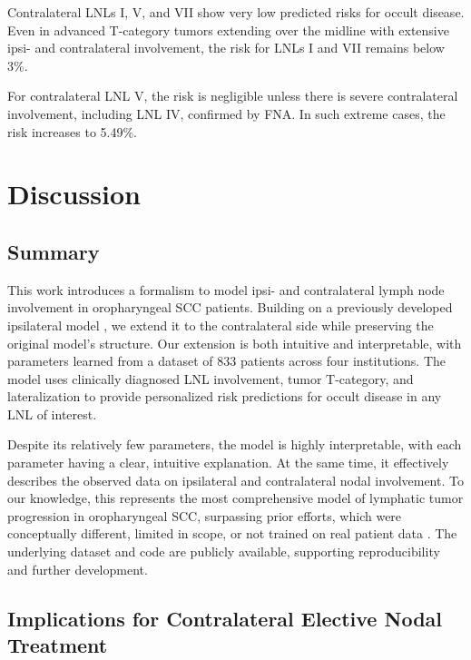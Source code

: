 \documentclass[
  sn-mathphys-num,
]{sn-jnl}
\begin{document}
Contralateral LNLs I, V, and VII show very low predicted risks for
occult disease. Even in advanced T-category tumors extending over the
midline with extensive ipsi- and contralateral involvement, the risk for
LNLs I and VII remains below 3\%.

For contralateral LNL V, the risk is negligible unless there is severe
contralateral involvement, including LNL IV, confirmed by FNA. In such
extreme cases, the risk increases to 5.49\%.

\section{Discussion}\label{sec-discussion}

\subsection{Summary}\label{summary}

This work introduces a formalism to model ipsi- and contralateral lymph
node involvement in oropharyngeal SCC patients. Building on a previously
developed ipsilateral model
\citep{ludwig_hidden_2021, ludwig_modelling_2023}, we extend it to the
contralateral side while preserving the original model's structure. Our
extension is both intuitive and interpretable, with parameters learned
from a dataset of 833 patients across four institutions. The model uses
clinically diagnosed LNL involvement, tumor T-category, and
lateralization to provide personalized risk predictions for occult
disease in any LNL of interest.

Despite its relatively few parameters, the model is highly
interpretable, with each parameter having a clear, intuitive
explanation. At the same time, it effectively describes the observed
data on ipsilateral and contralateral nodal involvement. To our
knowledge, this represents the most comprehensive model of lymphatic
tumor progression in oropharyngeal SCC, surpassing prior efforts, which
were conceptually different, limited in scope, or not trained on real
patient data \citep{benson_markov_2006, jung_development_2017}. The
underlying dataset and code are publicly available, supporting
reproducibility and further development.

\subsection{Implications for Contralateral Elective Nodal
Treatment}\label{implications-for-contralateral-elective-nodal-treatment}
\end{document}
